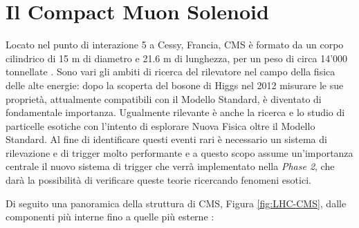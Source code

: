 \section{Il Compact Muon Solenoid}  
\label{sec:CMSDescrizione}

Locato nel punto di interazione 5 a Cessy, Francia, CMS è formato da un corpo cilindrico di 15 m di diametro e 21.6 m di lunghezza, per un peso di circa 14'000 tonnellate \cite{cms2008cms}. Sono vari gli ambiti di ricerca del rilevatore nel campo della fisica delle alte energie: dopo la scoperta del bosone di Higgs nel 2012 misurare le sue proprietà, attualmente compatibili con il Modello Standard, è diventato di fondamentale importanza. Ugualmente rilevante è anche la ricerca e lo studio di particelle esotiche con l'intento di esplorare Nuova Fisica oltre il Modello Standard. Al fine di identificare questi eventi rari è necessario un sistema di rilevazione e di trigger molto performante \cite{sirunyan2020performance} e a questo scopo assume un'importanza centrale il nuovo sistema di trigger che verrà implementato nella \textit{Phase 2}, che darà la possibilità di verificare queste teorie ricercando fenomeni esotici.

Di seguito una panoramica della struttura di CMS, Figura \ref{fig:LHC-CMS}, dalle componenti più interne fino a quelle più esterne \cite{MasterThesisNicLai}:

